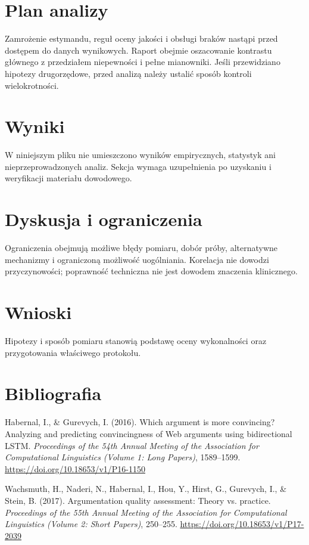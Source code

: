 \documentclass[11pt,a4paper]{article}
\begin{document}
\section{Plan analizy}

Zamrożenie estymandu, reguł oceny jakości i obsługi braków nastąpi przed dostępem do danych wynikowych. Raport obejmie oszacowanie kontrastu głównego z przedziałem niepewności i pełne mianowniki. Jeśli przewidziano hipotezy drugorzędowe, przed analizą należy ustalić sposób kontroli wielokrotności.

\section{Wyniki}

W niniejszym pliku nie umieszczono wyników empirycznych, statystyk ani nieprzeprowadzonych analiz. Sekcja wymaga uzupełnienia po uzyskaniu i weryfikacji materiału dowodowego.

\section{Dyskusja i ograniczenia}

Ograniczenia obejmują możliwe błędy pomiaru, dobór próby, alternatywne mechanizmy i ograniczoną możliwość uogólniania. Korelacja nie dowodzi przyczynowości; poprawność techniczna nie jest dowodem znaczenia klinicznego.

\section{Wnioski}

Hipotezy i sposób pomiaru stanowią podstawę oceny wykonalności oraz przygotowania właściwego protokołu.

\section*{Bibliografia}

{\setlength{\parindent}{0pt}
\setlength{\parskip}{5pt}
\hangindent=1.27cm
Habernal, I., \& Gurevych, I. (2016). Which argument is more convincing? Analyzing and predicting convincingness of Web arguments using bidirectional LSTM. \textit{Proceedings of the 54th Annual Meeting of the Association for Computational Linguistics (Volume 1: Long Papers)}, 1589--1599. \url{https://doi.org/10.18653/v1/P16-1150}\par
\hangindent=1.27cm
Wachsmuth, H., Naderi, N., Habernal, I., Hou, Y., Hirst, G., Gurevych, I., \& Stein, B. (2017). Argumentation quality assessment: Theory vs. practice. \textit{Proceedings of the 55th Annual Meeting of the Association for Computational Linguistics (Volume 2: Short Papers)}, 250--255. \url{https://doi.org/10.18653/v1/P17-2039}\par
}
\end{document}
